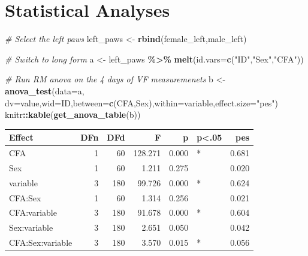 \documentclass[
]{book}
\newenvironment{Shaded}{\begin{snugshade}}{\end{snugshade}}
\newcommand{\AttributeTok}[1]{\textcolor[rgb]{0.13,0.29,0.53}{#1}}
\newcommand{\CommentTok}[1]{\textcolor[rgb]{0.56,0.35,0.01}{\textit{#1}}}
\newcommand{\FunctionTok}[1]{\textcolor[rgb]{0.13,0.29,0.53}{\textbf{#1}}}
\newcommand{\NormalTok}[1]{#1}
\newcommand{\OtherTok}[1]{\textcolor[rgb]{0.56,0.35,0.01}{#1}}
\newcommand{\SpecialCharTok}[1]{\textcolor[rgb]{0.81,0.36,0.00}{\textbf{#1}}}
\newcommand{\StringTok}[1]{\textcolor[rgb]{0.31,0.60,0.02}{#1}}
\begin{document}
\hypertarget{statistical-analyses-2}{%
\section*{Statistical Analyses}\label{statistical-analyses-2}}

\begin{Shaded}
\begin{Highlighting}[]
\CommentTok{\# Select the left paws}
\NormalTok{left\_paws }\OtherTok{\textless{}{-}} \FunctionTok{rbind}\NormalTok{(female\_left,male\_left)}

\CommentTok{\# Switch to long form}
\NormalTok{a }\OtherTok{\textless{}{-}}\NormalTok{ left\_paws }\SpecialCharTok{\%\textgreater{}\%} 
  \FunctionTok{melt}\NormalTok{(}\AttributeTok{id.vars=}\FunctionTok{c}\NormalTok{(}\StringTok{"ID"}\NormalTok{,}\StringTok{"Sex"}\NormalTok{,}\StringTok{"CFA"}\NormalTok{))}

\CommentTok{\# Run RM anova on the 4 days of VF measuremenets}
\NormalTok{b }\OtherTok{\textless{}{-}} \FunctionTok{anova\_test}\NormalTok{(}\AttributeTok{data=}\NormalTok{a, }\AttributeTok{dv=}\NormalTok{value,}\AttributeTok{wid=}\NormalTok{ID,}\AttributeTok{between=}\FunctionTok{c}\NormalTok{(CFA,Sex),}\AttributeTok{within=}\NormalTok{variable,}\AttributeTok{effect.size=}\StringTok{"pes"}\NormalTok{)}
\NormalTok{knitr}\SpecialCharTok{::}\FunctionTok{kable}\NormalTok{(}\FunctionTok{get\_anova\_table}\NormalTok{(b))}
\end{Highlighting}
\end{Shaded}

\begin{tabular}{l|r|r|r|r|l|r}
\hline
Effect & DFn & DFd & F & p & p<.05 & pes\\
\hline
CFA & 1 & 60 & 128.271 & 0.000 & * & 0.681\\
\hline
Sex & 1 & 60 & 1.211 & 0.275 &  & 0.020\\
\hline
variable & 3 & 180 & 99.726 & 0.000 & * & 0.624\\
\hline
CFA:Sex & 1 & 60 & 1.314 & 0.256 &  & 0.021\\
\hline
CFA:variable & 3 & 180 & 91.678 & 0.000 & * & 0.604\\
\hline
Sex:variable & 3 & 180 & 2.651 & 0.050 &  & 0.042\\
\hline
CFA:Sex:variable & 3 & 180 & 3.570 & 0.015 & * & 0.056\\
\hline
\end{tabular}
\end{document}
